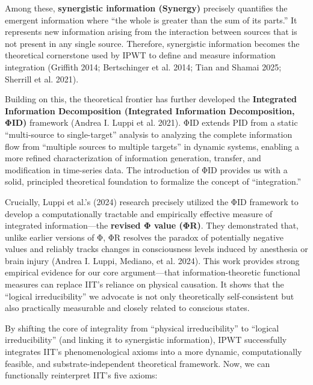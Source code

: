 \documentclass[
  a4paper]{article}
\begin{document}
\begin{enumerate}
  Among these, \textbf{synergistic information (Synergy)} precisely
  quantifies the emergent information where ``the whole is greater than
  the sum of its parts.'' It represents new information arising from the
  interaction between sources that is not present in any single source.
  Therefore, synergistic information becomes the theoretical cornerstone
  used by IPWT to define and measure information integration (Griffith
  2014; Bertschinger et al. 2014; Tian and Shamai 2025; Sherrill et al.
  2021).

  Building on this, the theoretical frontier has further developed the
  \textbf{Integrated Information Decomposition (Integrated Information
  Decomposition, ΦID)} framework (Andrea I. Luppi et al. 2021). ΦID
  extends PID from a static ``multi-source to single-target'' analysis
  to analyzing the complete information flow from ``multiple sources to
  multiple targets'' in dynamic systems, enabling a more refined
  characterization of information generation, transfer, and modification
  in time-series data. The introduction of ΦID provides us with a solid,
  principled theoretical foundation to formalize the concept of
  ``integration.''

  Crucially, Luppi et al.'s (2024) research precisely utilized the ΦID
  framework to develop a computationally tractable and empirically
  effective measure of integrated information---the \textbf{revised Φ
  value (ΦR)}. They demonstrated that, unlike earlier versions of Φ, ΦR
  resolves the paradox of potentially negative values and reliably
  tracks changes in consciousness levels induced by anesthesia or brain
  injury (Andrea I. Luppi, Mediano, et al. 2024). This work provides
  strong empirical evidence for our core argument---that
  information-theoretic functional measures can replace IIT's reliance
  on physical causation. It shows that the ``logical irreducibility'' we
  advocate is not only theoretically self-consistent but also
  practically measurable and closely related to conscious states.

  By shifting the core of integrality from ``physical irreducibility''
  to ``logical irreducibility'' (and linking it to synergistic
  information), IPWT successfully integrates IIT's phenomenological
  axioms into a more dynamic, computationally feasible, and
  substrate-independent theoretical framework. Now, we can functionally
  reinterpret IIT's five axioms:


\end{enumerate}
\end{document}
